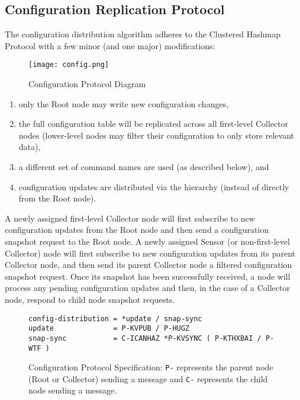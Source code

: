 \subsection{Configuration Replication Protocol}
\label{proto_config}

The \dcamp configuration distribution algorithm adheres to the Clustered Hashmap Protocol\cite{chp} with a few minor
(and one major) modifications:

\begin{figure}[ht]
    \centering
    \texttt{[image: config.png]}
    \caption{Configuration Protocol Diagram}
    \label{fig:proto_config_image}
\end{figure}

\begin{enumerate}
\item only the Root node may write new configuration changes,
\item the full configuration table will be replicated across all first-level Collector nodes (lower-level nodes may
      filter their configuration to only store relevant data),
\item a different set of command names are used (as described below), and
\item configuration updates are distributed via the \dcamp hierarchy (instead of directly from the Root node).
\end{enumerate}

A newly assigned first-level Collector node will first subscribe to new configuration updates from the Root node and
then send a configuration snapshot request to the Root node. A newly assigned Sensor (or non-first-level Collector) node
will first subscribe to new configuration updates from its parent Collector node, and then send its parent Collector
node a filtered configuration snapshot request. Once its snapshot has been successfully received, a node will process
any pending configuration updates and then, in the case of a Collector node, respond to child node snapshot requests.

\begin{figure}[ht]
\vspace{+10pt}
\begin{verbatim}
config-distribution = *update / snap-sync
update              = P-KVPUB / P-HUGZ
snap-sync           = C-ICANHAZ *P-KVSYNC ( P-KTHXBAI / P-WTF )
\end{verbatim}
\vspace{-5pt}
\caption[Configuration Protocol Specification]
	{Configuration Protocol Specification: \texttt{P-} represents the parent node (Root or Collector) sending a
	 message and \texttt{C-} represents the child node sending a message.}
\label{fig:proto_config_spec}
\end{figure}

